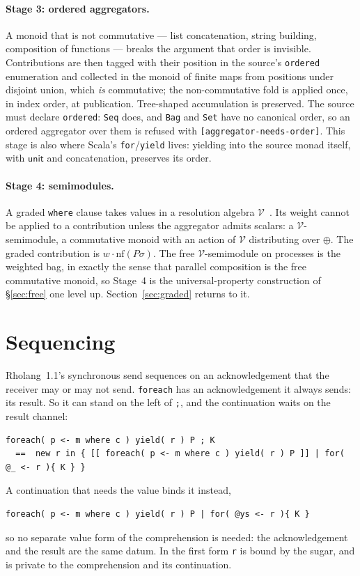 \documentclass[11pt]{article}
\theoremstyle{definition}
\theoremstyle{plain}
\theoremstyle{remark}
\newcommand{\unit}{\mathsf{unit}}
\newcommand{\nf}{\mathrm{nf}}
\newcommand{\fe}{\texttt{foreach}}
\begin{document}
\paragraph{Stage 3: ordered aggregators.} A monoid that is not commutative ---
list concatenation, string building, composition of functions --- breaks the
argument that order is invisible. Contributions are then tagged with their
position in the source's \texttt{ordered} enumeration and collected in the
monoid of finite maps from positions under disjoint union, which \emph{is}
commutative; the non-commutative fold is applied once, in index order, at
publication. Tree-shaped accumulation is preserved. The source must declare
\texttt{ordered}: \texttt{Seq} does, and \texttt{Bag} and \texttt{Set} have no
canonical order, so an ordered aggregator over them is refused with
\texttt{[aggregator-needs-order]}. This stage is also where Scala's
\texttt{for}/\texttt{yield} lives: yielding into the source monad itself, with
\(\unit\) and concatenation, preserves its order.

\paragraph{Stage 4: semimodules.} A graded \texttt{where} clause takes values in
a resolution algebra \(\mathcal V\)~\cite{GradedWhere}. Its weight cannot be
applied to a contribution unless the aggregator admits scalars: a
\(\mathcal V\)-semimodule, a commutative monoid with an action of \(\mathcal V\)
distributing over \(\oplus\). The graded contribution is \(w \cdot
\nf(P\sigma)\). The free \(\mathcal V\)-semimodule on processes is the weighted
bag, in exactly the sense that parallel composition is the free commutative
monoid, so Stage~4 is the universal-property construction of
\S\ref{sec:free} one level up. Section~\ref{sec:graded} returns to it.

\section{Sequencing}
\label{sec:seq}

Rholang~1.1's synchronous send sequences on an acknowledgement that the
receiver may or may not send. \fe{} has an acknowledgement it always sends: its
result. So it can stand on the left of \texttt{;}, and the continuation waits on
the result channel:
\begin{lstlisting}
foreach( p <- m where c ) yield( r ) P ; K
  ==  new r in { [[ foreach( p <- m where c ) yield( r ) P ]] | for( @_ <- r ){ K } }
\end{lstlisting}
A continuation that needs the value binds it instead,
\begin{lstlisting}
foreach( p <- m where c ) yield( r ) P | for( @ys <- r ){ K }
\end{lstlisting}
so no separate value form of the comprehension is needed: the acknowledgement
and the result are the same datum. In the first form \texttt{r} is bound by the
sugar, and is private to the comprehension and its continuation.
\end{document}
